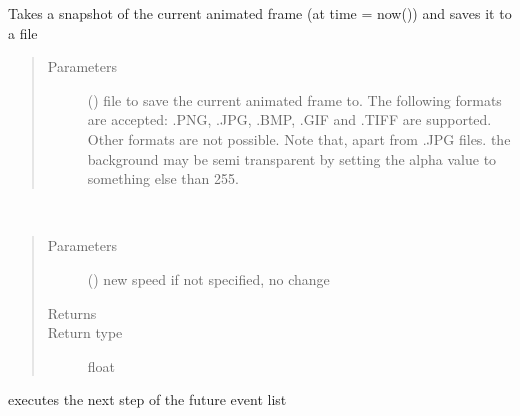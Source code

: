 \documentclass[letterpaper,10pt,english]{sphinxmanual}
\begin{document}
\begin{fulllineitems}
\begin{fulllineitems}
\label{\detokenize{Reference:salabim.Environment.snapshot}}
Takes a snapshot of the current animated frame (at time = now()) and saves it to a file
\begin{quote}\begin{description}
\item[{Parameters}] \leavevmode
{} () \textendash{} file to save the current animated frame to. 
The following formats are accepted: .PNG, .JPG, .BMP, .GIF and .TIFF are supported.
Other formats are not possible.
Note that, apart from .JPG files. the background may be semi transparent by setting
the alpha value to something else than 255.

\end{description}\end{quote}

\end{fulllineitems}


\begin{fulllineitems}
\label{\detokenize{Reference:salabim.Environment.speed}}~\begin{quote}\begin{description}
\item[{Parameters}] \leavevmode
{} () \textendash{} new speed 
if not specified, no change

\item[{Returns}] \leavevmode
{}

\item[{Return type}] \leavevmode
float

\end{description}\end{quote}

\end{fulllineitems}


\begin{fulllineitems}
\label{\detokenize{Reference:salabim.Environment.step}}
executes the next step of the future event list


\end{fulllineitems}
\end{fulllineitems}
\end{document}
